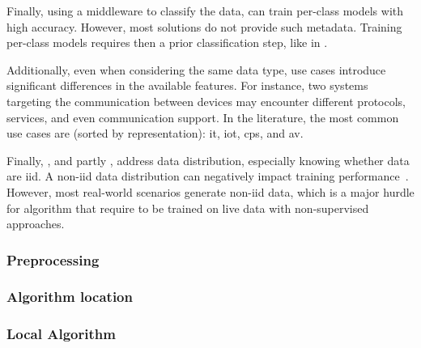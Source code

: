 Finally, using a middleware to classify the data, \textcite{pahl_AllEyesYou_2018} can train per-class models with high accuracy.
However, most solutions do not provide such metadata.
Training per-class models requires then a prior classification step, like in \cite{nguyen_DIoTFederatedSelflearning_2019}.

Additionally, even when considering the same data type, use cases introduce significant differences in the available features.
For instance, two systems targeting the communication between devices may encounter different protocols, services, and even communication support.
In the literature, the most common use cases are (sorted by representation): \acrfull{it}, \acrfull{iot}, \acrfull{cps}, and \acrfull{av}.


Finally, \cite{chen_Networkanomalydetection_2020}, and partly  \cite{hei_trustedfeatureaggregator_2020}, address data distribution, especially knowing whether data are \gls{iid}.
A non-\gls{iid} data distribution can negatively impact training performance~\cite{Yang2019}.
However, most real-world scenarios generate non-\gls{iid} data, which is a major hurdle for algorithm that require to be trained on live data with non-supervised approaches.

\subsubsection{Preprocessing\label{sec:sota.quali.preprocess}}

\subsubsection{Algorithm location\label{sec:sota.quali.location}}

\subsubsection{Local Algorithm\label{sec:sota.quali.alg}}


